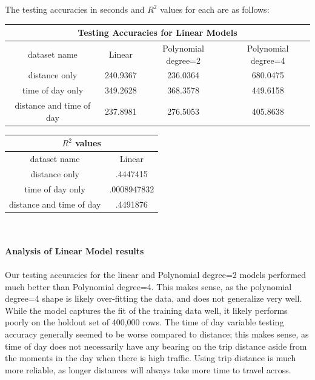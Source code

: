 \documentclass[letterpaper, 12 pt, conference]{article}
\begin{document}
The testing accuracies in seconds and $R^2$ values for each are as follows: 
\begin{center}
 \begin{tabular}{||c || c c c||} 
 \hline
  \multicolumn{4}{|c|}{Testing Accuracies for Linear Models} \\
  \hline
dataset name & Linear & Polynomial degree=2 & Polynomial degree=4\\ [0.5ex] 
 \hline\hline
 distance only & 240.9367 & 236.0364 & 680.0475\\ 
 \hline
 time of day only & 349.2628 & 368.3578 & 449.6158\\
 \hline
 distance and time of day & 237.8981 & 276.5053 & 405.8638\\ [1ex] 
 \hline
\end{tabular}
\end{center}

\begin{center}
 \begin{tabular}{||c || c||} 
 \hline
 \multicolumn{2}{|c|}{$R^2$ values} \\
  \hline
dataset name & Linear\\ [0.5ex] 
 \hline\hline
 distance only & .4447415\\ 
 \hline
 time of day only & .0008947832\\
 \hline
 distance and time of day & .4491876\\ [1ex] 
 \hline
\end{tabular}
\end{center}
\\
\\
\textbf{Analysis of Linear Model results}
\\
\\Our testing accuracies for the linear and Polynomial degree=2 models performed much better than 
Polynomial degree=4. This makes sense, as the polynomial degree=4 shape is likely over-fitting the data, and does not generalize very well. While the model captures the fit of the training data well, it likely performs poorly on the holdout set of 400,000 rows. The time of day variable testing accuracy generally seemed to be worse compared to distance; this makes sense, as time of day does not necessarily have any bearing on the trip distance aside from the moments in the day when there is high traffic. Using trip distance is much more reliable, as longer distances will always take more time to travel across. 
\end{document}
